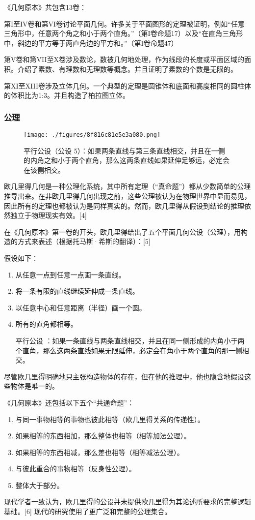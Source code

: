 《几何原本》共包含13卷：

第I至IV卷和第VI卷讨论平面几何。许多关于平面图形的定理被证明，例如“任意三角形中，任意两个角之和小于两个直角。”（第I卷命题17）以及“在直角三角形中，斜边的平方等于两直角边的平方和。”（第I卷命题47）

第V卷和第VII至X卷涉及数论，数被几何地处理，作为线段的长度或平面区域的面积。介绍了素数、有理数和无理数等概念。并且证明了素数的个数是无限的。

第XI至XIII卷涉及立体几何。一个典型的定理是圆锥体和底面和高度相同的圆柱体的体积比为1:3。并且构造了柏拉图立体。
\subsubsection{公理}
\begin{figure}[ht]
\centering
\texttt{[image: ./figures/8f816c81e5e3a080.png]}
\caption{平行公设（公设 5）：如果两条直线与第三条直线相交，并且在一侧的内角之和小于两个直角，那么这两条直线如果延伸足够远，必定会在该侧相交。} \label{fig_OJLJH_2}
\end{figure}
欧几里得几何是一种公理化系统，其中所有定理（“真命题”）都从少数简单的公理推导出来。在非欧几里得几何出现之前，这些公理被认为在物理世界中显而易见，因此所有的定理也都被认为是同样真实的。然而，欧几里得从假设到结论的推理依然独立于物理现实有效。[4]

在《几何原本》第一卷的开头，欧几里得给出了五个平面几何公设（公理），用构造的方式来表述（根据托马斯·希斯的翻译）：[5]

假设如下：
\begin{enumerate}
\item 从任意一点到任意一点画一条直线。
\item 将一条有限的直线继续延伸成一条直线。
\item 以任意中心和任意距离（半径）画一个圆。
\item 所有的直角都相等。
\item [平行公设]：如果一条直线与两条直线相交，并且在同一侧形成的内角小于两个直角，那么这两条直线如果无限延伸，必定会在角小于两个直角的那一侧相交。
\end{enumerate}

尽管欧几里得明确地只主张构造物体的存在，但在他的推理中，他也隐含地假设这些物体是唯一的。

《几何原本》还包括以下五个“共通命题”：
\begin{enumerate}
\item 与同一事物相等的事物也彼此相等（欧几里得关系的传递性）。
\item 如果相等的东西相加，那么整体也相等（相等加法公理）。
\item 如果相等的东西相减，那么差也相等（相等减法公理）。
\item 与彼此重合的事物相等（反身性公理）。
\item 整体大于部分。
\end{enumerate}
现代学者一致认为，欧几里得的公设并未提供欧几里得为其论述所要求的完整逻辑基础。[6] 现代的研究使用了更广泛和完整的公理集合。

